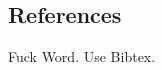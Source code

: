 \documentclass[10pt]{article}
\begin{document}
\subsection{References}
Fuck Word. Use Bibtex. 
\end{document}

